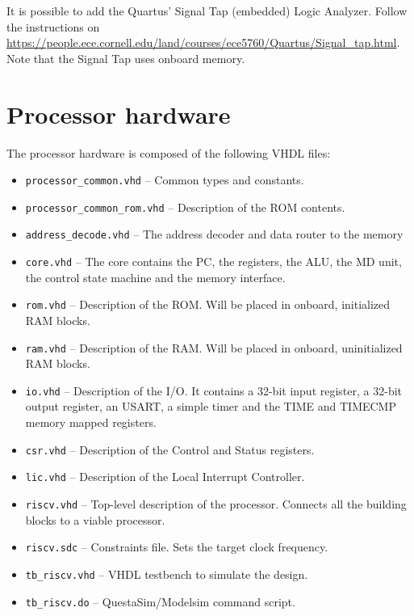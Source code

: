 \documentclass[12pt]{article}
\begin{document}
It is possible to add the Quartus' Signal Tap (embedded) Logic Analyzer. Follow the instructions on \url{https://people.ece.cornell.edu/land/courses/ece5760/Quartus/Signal_tap.html}. Note that the Signal Tap uses onboard memory.

\section{Processor hardware}
The processor hardware is composed of the following VHDL files:

\begin{itemize}
\item \lstinline|processor_common.vhd| -- Common types and constants.
\item \lstinline|processor_common_rom.vhd| -- Description of the ROM contents.
\item \lstinline|address_decode.vhd| -- The address decoder and data router to the memory \item \lstinline|core.vhd| -- The core contains the PC, the registers, the ALU, the MD unit, the control state machine and the memory interface.
\item \lstinline|rom.vhd| -- Description of the ROM. Will be placed in onboard, initialized RAM blocks. 
\item \lstinline|ram.vhd| -- Description of the RAM. Will be placed in onboard, uninitialized RAM blocks. 
\item \lstinline|io.vhd| -- Description of the I/O. It contains a 32-bit input register, a 32-bit output register, an USART, a simple timer and the TIME and TIMECMP memory mapped registers.
\item \lstinline|csr.vhd| -- Description of the Control and Status registers.
\item \lstinline|lic.vhd| -- Description of the Local Interrupt Controller.
\item \lstinline|riscv.vhd| -- Top-level description of the processor. Connects all the building blocks to a viable processor.
\item \lstinline|riscv.sdc| -- Constraints file. Sets the target clock frequency.
\item \lstinline|tb_riscv.vhd| -- VHDL testbench to simulate the design.
\item \lstinline|tb_riscv.do| -- QuestaSim/Modelsim command script.
\end{itemize}
\end{document}
